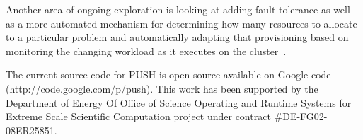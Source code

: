 \documentclass[11pt, letterpaper]{article}
\begin{document}
Another area of ongoing exploration is looking at adding fault tolerance as 
well as a more automated mechanism for determining how many resources to 
allocate to a particular problem and automatically adapting that provisioning 
based on monitoring the changing workload as it executes on the 
cluster~\cite{evh2008mtags}.

The current source code for PUSH is open source available on Google code
(http://code.google.com/p/push).
This work has been supported by the Department of Energy Of Office of Science Operating and Runtime Systems for Extreme Scale Scientific Computation project under contract \#DE-FG02-08ER25851. 



\end{document}
